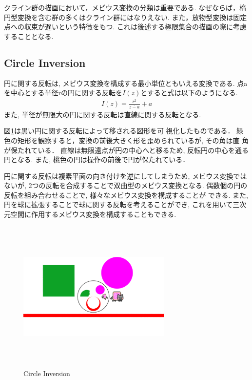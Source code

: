 クライン群の描画において，メビウス変換の分類は重要である.
なぜならば，楕円型変換を含む群の多くはクライン群にはなりえない.
また，放物型変換は固定点への収束が遅いという特徴をもつ.
これは後述する極限集合の描画の際に考慮することとなる.

\subsection{Circle Inversion}

円に関する反転は, メビウス変換を構成する最小単位ともいえる変換である.
点aを中心とする半径rの円に関する反転を$I(z)$とすると式は以下のようになる.
\begin{align*}
I(z) = \frac{r^2}{\overline{z - a}} + a
\end{align*}
また, 半径が無限大の円に関する反転は直線に関する反転となる.

図\ref{fig:circleInversion}は黒い円に関する反転によって移される図形を可
視化したものである．
緑色の矩形を観察すると，変換の前後大きく形を歪められているが, その角は直
角が保たれている．
直線は無限遠点が円の中心へと移るため, 反転円の中心を通る円となる.
また, 桃色の円は操作の前後で円が保たれている．

円に関する反転は複素平面の向き付けを逆にしてしまうため, メビウス変換では
ないが, 2つの反転を合成することで双曲型のメビウス変換となる.
偶数個の円の反転を組み合わせることで, 様々なメビウス変換を構成することが
できる.
また, 円を球に拡張することで球に関する反転を考えることができ,
これを用いて三次元空間に作用するメビウス変換を構成することもできる.

\begin{figure}[htbp]
 \begin{center}
      \includegraphics[width=3in, height=3in, keepaspectratio]{../img/klein/circleInversion.pdf}
    \caption{Circle Inversion}
    \label{fig:circleInversion}
 \end{center}
\end{figure}

